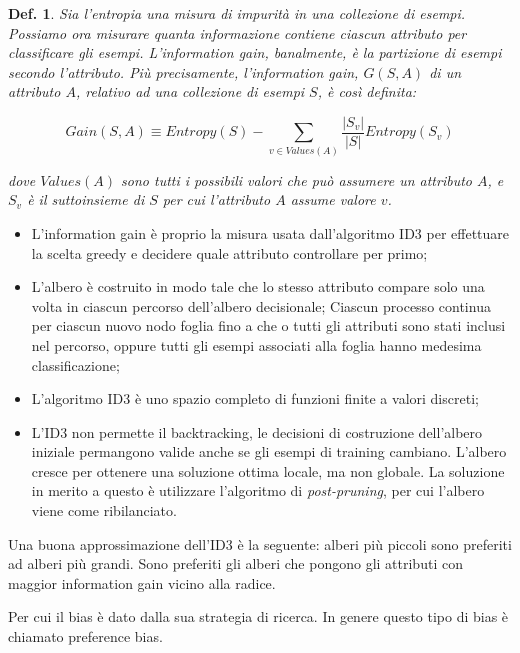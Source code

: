 \documentclass{article}
\newtheorem{definition}{Def.}[section]
\begin{document}
\begin{definition}
	Sia l'entropia una misura di impurità in una collezione di esempi. Possiamo 
	ora misurare quanta informazione contiene ciascun attributo per classificare 
	gli esempi. L'\textit{information gain}, banalmente, è la partizione di 
	esempi secondo l'attributo. Più precisamente, l'information gain, $G(S,A)$ 
	di un attributo $A$, relativo ad una collezione di esempi $S$, è così 
	definita:

	\begin{equation}
		Gain(S, A) \equiv Entropy(S) - \sum_{v \in Values(A)} \frac{|S_v|}{|S|}
		Entropy(S_v)
	\end{equation}

	dove $Values(A)$ sono tutti i possibili valori che può assumere un attributo
	$A$, e $S_v$ è il suttoinsieme di $S$ per cui l'attributo $A$ assume valore
	$v$.
\end{definition}

\begin{itemize}
	\item L'information gain è proprio la misura usata dall'algoritmo ID3 per 
		effettuare la scelta greedy e decidere quale attributo controllare per 
		primo;
	\item L'albero è costruito in modo tale che lo stesso attributo compare solo 
		una volta in ciascun percorso dell'albero decisionale; 
		Ciascun processo continua per ciascun nuovo nodo foglia fino a che o 
		tutti gli attributi sono stati inclusi nel percorso, oppure tutti gli 
		esempi associati alla foglia hanno medesima classificazione;
	\item L'algoritmo ID3 è uno spazio completo di funzioni finite a valori 
		discreti;
	\item L'ID3 non permette il backtracking, le decisioni di costruzione 
		dell'albero iniziale permangono valide anche se gli esempi di 
		training cambiano. 
		L'albero cresce per ottenere una soluzione ottima locale, ma non 
		globale. La soluzione in merito a questo è utilizzare l'algoritmo di 
		\textit{post-pruning}, per cui l'albero viene come ribilanciato.
\end{itemize}

Una buona approssimazione dell'ID3 è la seguente: alberi più piccoli sono
preferiti ad alberi più grandi. Sono preferiti gli alberi che pongono gli
attributi con maggior information gain vicino alla radice.

Per cui il bias è dato dalla sua strategia di ricerca. In genere questo tipo di
bias è chiamato preference bias.
\end{document}
